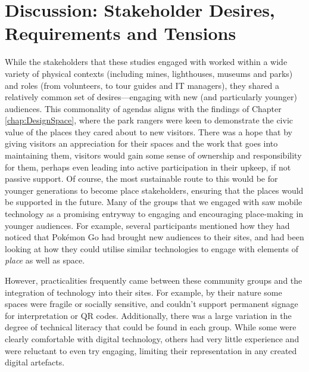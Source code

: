 \section{Discussion: Stakeholder Desires, Requirements and Tensions}

While the stakeholders that these studies engaged with worked within a wide variety of physical contexts (including mines, lighthouses, museums and parks) and roles (from volunteers, to tour guides and IT managers), they shared a relatively common set of desires---engaging with new (and particularly younger) audiences. This commonality of agendas aligns with the findings of Chapter \ref{chap:DesignSpace}, where the park rangers were keen to demonstrate the civic value of the places they cared about to new visitors. There was a hope that by giving visitors an appreciation for their spaces and the work that goes into maintaining them, visitors would gain some sense of ownership and responsibility for them, perhaps even leading into active participation in their upkeep, if not passive support. Of course, the most sustainable route to this would be for younger generations to become place stakeholders, ensuring that the places would be supported in the future. Many of the groups that we engaged with saw mobile technology as a promising entryway to engaging and encouraging place-making in younger audiences. For example, several participants mentioned how they had noticed that Pok\'emon Go had brought new audiences to their sites, and had been looking at how they could utilise similar technologies to engage with elements of \textit{place} as well as space.

However, practicalities frequently came between these community groups and the integration of technology into their sites. For example, by their nature some spaces were fragile or socially sensitive, and couldn't support permanent signage for interpretation or QR codes. Additionally, there was a large variation in the degree of technical literacy that could be found in each group. While some were clearly comfortable with digital technology, others had very little experience and were reluctant to even try engaging, limiting their representation in any created digital artefacts.

